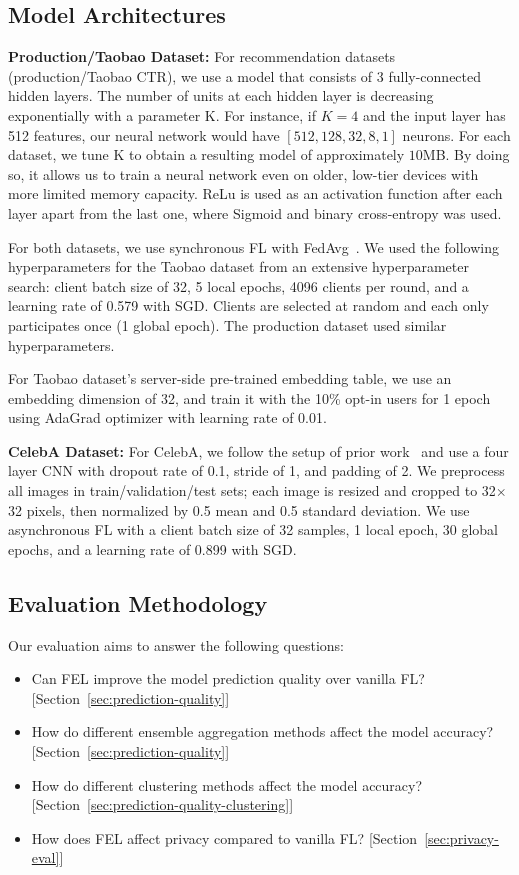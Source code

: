 \documentclass{article}
\begin{document}
\subsection{Model Architectures}
{\bf Production/Taobao Dataset:}
For recommendation datasets (production/Taobao CTR), we use a model that consists of 3 fully-connected hidden layers. The number of units at each hidden layer is decreasing exponentially with a parameter K. For instance, if $K=4$ and the input layer has 512 features, our neural network would have  $[512, 128, 32, 8, 1]$ neurons. For each dataset, we tune K to obtain a resulting model of approximately $10$MB. By doing so, it allows us to train a neural network even on older, low-tier devices with more limited memory capacity. ReLu is used as an activation function after each layer apart from the last one, where Sigmoid and binary cross-entropy was used.

For both datasets, we use synchronous FL with FedAvg~\cite{Mani-mcmahan2017learning}. We used the following hyperparameters for the Taobao dataset from an extensive hyperparameter search: client batch size of 32, 5 local epochs, 4096 clients per round, and a learning rate of 0.579 with SGD. Clients are selected at random and each only participates once (1 global epoch). The production dataset used similar hyperparameters.

For Taobao dataset's server-side pre-trained embedding table, we use an embedding dimension of 32, and train it with the 10\% opt-in users for 1 epoch using AdaGrad optimizer with learning rate of 0.01.

{\bf CelebA Dataset:}
For CelebA, we follow the setup of prior work~\cite{Mani-nguyen2021federated} and use a four layer CNN with dropout rate of 0.1, stride of 1, and padding of 2. We preprocess all images in train/validation/test sets; each image is resized and cropped to 32$\times$32 pixels, then normalized by 0.5 mean and 0.5 standard deviation. We use asynchronous FL with a client batch size of 32 samples, 1 local epoch, 30 global epochs, and a learning rate of 0.899 with SGD.

\subsection{Evaluation Methodology}
\label{sec:appendix-b}
Our evaluation aims to answer the following questions:

\begin{itemize}
    \item Can FEL improve the model prediction quality over vanilla FL? [Section~\ref{sec:prediction-quality}]
    \item How do different ensemble aggregation methods affect the model accuracy? [Section~\ref{sec:prediction-quality}]
    \item How do different clustering methods affect the model accuracy? [Section~\ref{sec:prediction-quality-clustering}]
    \item How does FEL affect privacy compared to vanilla FL? [Section~\ref{sec:privacy-eval}]
\end{itemize}
\end{document}
